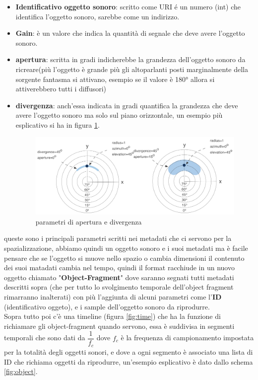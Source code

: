 \documentclass[12pt,a4paper]{report}
\begin{document}
\begin{itemize}
\item \textbf{Identificativo oggetto sonoro}: scritto come URI é un numero (int) che identifica l'oggetto sonoro, sarebbe come un indirizzo.
\item \textbf{Gain}: è un valore che indica la quantità di segnale che deve avere l'oggetto sonoro.
\item \textbf{apertura}: scritta in gradi indicherebbe la grandezza dell'oggetto sonoro da ricreare(più l'oggetto è grande più gli altoparlanti posti marginalmente della sorgente fantasma si attivano, esempio se il valore è 180° allora si attiverebbero tutti i diffusori)
\item \textbf{divergenza}: anch'essa indicata in gradi quantifica la grandezza che deve avere l'oggetto sonoro ma solo sul piano orizzontale, un esempio più esplicativo si ha in figura \ref{fig:apertura}.
	
	\begin{figure}[htbp]
	\centering
	\includegraphics[scale=0.35]{figures/apertura.png}
	\caption {parametri di apertura e divergenza} 
	\label{fig:apertura}
	\end{figure}
	
	
\end{itemize}

queste sono i principali parametri scritti nei metadati che ci servono per la spazializzazione, abbiamo quindi un  oggetto sonoro e i suoi metadati ma è facile pensare che se l'oggetto si muove nello spazio o cambia dimensioni il contenuto dei suoi matadati cambia nel tempo, quindi il format racchiude in un nuovo oggetto chiamato "\textbf{Object-Fragment}" dove saranno segnati tutti metadati descritti sopra (che per tutto lo svolgimento temporale dell'object fragment rimarranno inalterati) con più l'aggiunta di alcuni parametri come l'\textbf{ID} (identificativo oggeto), e i sample dell'oggetto sonoro da riprodurre.\\

Sopra tutto poi c'è una timeline (figura \ref{fig:time}) che ha la funzione di richiamare gli object-fragment quando servono, essa è suddivisa in segmenti temporali che sono dati da $\dfrac{1}{f_c}$ dove $f_c$ è la frequenza di campionamento impostata per la totalità degli oggetti sonori, e dove a ogni segmento è associato una lista di ID che richiama oggetti da riprodurre, un'esempio esplicativo è dato dallo schema \ref{fig:object}.\\
\end{document}
